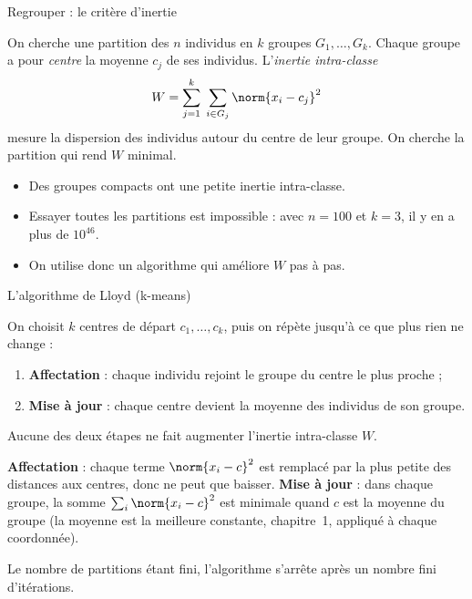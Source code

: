 \documentclass[aspectratio=169,11pt]{beamer}
\begin{document}
\begin{frame}{Regrouper : le critère d'inertie}
  \begin{definition}
    On cherche une partition des $n$ individus en $k$ groupes $G_1,\dots,G_k$. Chaque groupe a pour \emph{centre} la moyenne $c_j$ de ses individus. L'\emph{inertie intra-classe}
    \[
      W=\sum_{j=1}^k\;\sum_{i\in G_j}\norm{x_i-c_j}^2
    \]
    mesure la dispersion des individus autour du centre de leur groupe. On cherche la partition qui rend $W$ minimal.
  \end{definition}
  \begin{itemize}\small
    \item Des groupes compacts ont une petite inertie intra-classe.
    \item Essayer toutes les partitions est impossible : avec $n=100$ et $k=3$, il y en a plus de $10^{46}$.
    \item On utilise donc un algorithme qui améliore $W$ pas à pas.
  \end{itemize}
\end{frame}

\begin{frame}{L'algorithme de Lloyd (k-means)}
  \begin{definition}[k-means]
    On choisit $k$ centres de départ $c_1,\dots,c_k$, puis on répète jusqu'à ce que plus rien ne change :
    \begin{enumerate}\setlength\itemsep{1pt}
      \item \textbf{Affectation} : chaque individu rejoint le groupe du centre le plus proche ;
      \item \textbf{Mise à jour} : chaque centre devient la moyenne des individus de son groupe.
    \end{enumerate}
  \end{definition}
  \begin{proposition}
    Aucune des deux étapes ne fait augmenter l'inertie intra-classe $W$.
  \end{proposition}
  \begin{preuve}
    \textbf{Affectation} : chaque terme $\norm{x_i-c}^2$ est remplacé par la plus petite des distances aux centres, donc ne peut que baisser.
    \textbf{Mise à jour} : dans chaque groupe, la somme $\sum_i\norm{x_i-c}^2$ est minimale quand $c$ est la moyenne du groupe (la moyenne est la meilleure constante, chapitre~1, appliqué à chaque coordonnée).
  \end{preuve}
  {\small\color{cnfGris}Le nombre de partitions étant fini, l'algorithme s'arrête après un nombre fini d'itérations.}
\end{frame}
\end{document}
